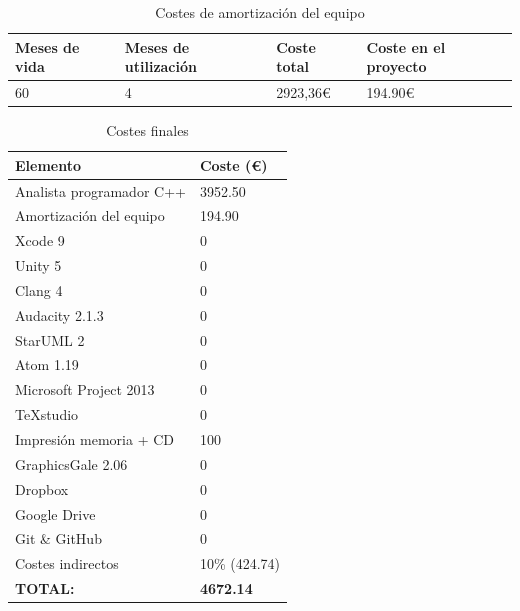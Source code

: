 \begin{table}
	\begin{tabular}{|l|l|l|l|}
		\hline
		\textbf{Meses de vida} & \textbf{Meses de utilización} & \textbf{Coste total} & \textbf{Coste en el proyecto}\\
		
		\hline
		60{}& 4{} & 2923,36\euro{} & 194.90\euro{} \\
		
		\hline
	\end{tabular}
	\caption{Costes de amortización del equipo}
	\label{tab:mac}
\end{table}


\begin{table}[h]
	\begin{center}
		\begin{tabular}{|l|l|}
			\hline
			\textbf{Elemento} & \textbf{Coste (\euro{})}\\
			
			\hline
			Analista programador C++ & 3952.50 \\
			\hline
			Amortización del equipo & 194.90 \\
			
			\hline
			Xcode 9& 0 \\
			
			\hline
			Unity 5& 0 \\
			
			\hline
			Clang 4& 0 \\
			
			\hline
			Audacity 2.1.3 & 0\\
			
			\hline
			StarUML 2& 0 \\
			
			\hline
			Atom 1.19& 0 \\
			
			\hline
			Microsoft Project 2013& 0 \\
			
			\hline
			TeXstudio& 0\\
			
			\hline
			Impresión memoria + CD & 100 \\
			
			\hline
			GraphicsGale 2.06& 0 \\
			
			\hline
			Dropbox& 0 \\
			
			\hline
			Google Drive& 0 \\
			
			\hline
			Git \& GitHub& 0 \\
			
			\hline
			Costes indirectos& 10\% (424.74) \\
			
			\hline
			\textbf{TOTAL: } & \textbf{4672.14} \\
			
			\hline
		\end{tabular}
		\caption{Costes finales}
		\label{tab:coste_final}
	\end{center}
\end{table}


